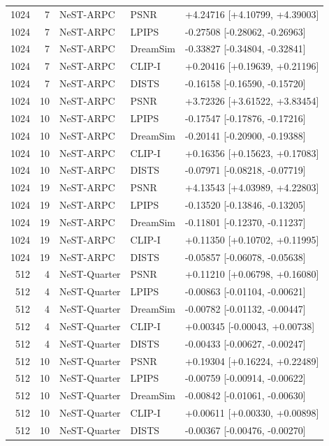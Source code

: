 \documentclass[10pt,letterpaper]{article}
\begin{document}
\begin{longtable}{@{}rrlll@{}}
1024 & 7 & NeST-ARPC & PSNR & +4.24716 [+4.10799, +4.39003]\\
1024 & 7 & NeST-ARPC & LPIPS & -0.27508 [-0.28062, -0.26963]\\
1024 & 7 & NeST-ARPC & DreamSim & -0.33827 [-0.34804, -0.32841]\\
1024 & 7 & NeST-ARPC & CLIP-I & +0.20416 [+0.19639, +0.21196]\\
1024 & 7 & NeST-ARPC & DISTS & -0.16158 [-0.16590, -0.15720]\\
1024 & 10 & NeST-ARPC & PSNR & +3.72326 [+3.61522, +3.83454]\\
1024 & 10 & NeST-ARPC & LPIPS & -0.17547 [-0.17876, -0.17216]\\
1024 & 10 & NeST-ARPC & DreamSim & -0.20141 [-0.20900, -0.19388]\\
1024 & 10 & NeST-ARPC & CLIP-I & +0.16356 [+0.15623, +0.17083]\\
1024 & 10 & NeST-ARPC & DISTS & -0.07971 [-0.08218, -0.07719]\\
1024 & 19 & NeST-ARPC & PSNR & +4.13543 [+4.03989, +4.22803]\\
1024 & 19 & NeST-ARPC & LPIPS & -0.13520 [-0.13846, -0.13205]\\
1024 & 19 & NeST-ARPC & DreamSim & -0.11801 [-0.12370, -0.11237]\\
1024 & 19 & NeST-ARPC & CLIP-I & +0.11350 [+0.10702, +0.11995]\\
1024 & 19 & NeST-ARPC & DISTS & -0.05857 [-0.06078, -0.05638]\\
512 & 4 & NeST-Quarter & PSNR & +0.11210 [+0.06798, +0.16080]\\
512 & 4 & NeST-Quarter & LPIPS & -0.00863 [-0.01104, -0.00621]\\
512 & 4 & NeST-Quarter & DreamSim & -0.00782 [-0.01132, -0.00447]\\
512 & 4 & NeST-Quarter & CLIP-I & +0.00345 [-0.00043, +0.00738]\\
512 & 4 & NeST-Quarter & DISTS & -0.00433 [-0.00627, -0.00247]\\
512 & 10 & NeST-Quarter & PSNR & +0.19304 [+0.16224, +0.22489]\\
512 & 10 & NeST-Quarter & LPIPS & -0.00759 [-0.00914, -0.00622]\\
512 & 10 & NeST-Quarter & DreamSim & -0.00842 [-0.01061, -0.00630]\\
512 & 10 & NeST-Quarter & CLIP-I & +0.00611 [+0.00330, +0.00898]\\
512 & 10 & NeST-Quarter & DISTS & -0.00367 [-0.00476, -0.00270]\\

\end{longtable}
\end{document}
